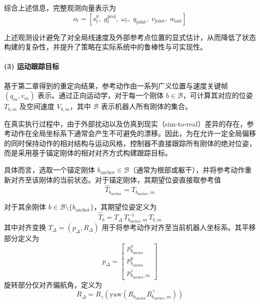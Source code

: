综合上述信息，完整观测向量表示为
\begin{equation}
	o_t = [s_t^g,\; g^{\text{proj}}_t,\; \omega_t,\; q_{\text{joint}},\; v_{\text{joint}},\; a_{\text{last}} ]
\end{equation}

上述观测设计避免了对全局线速度及外部参考点位置的显式估计，从而降低了状态构建的复杂性，并提升了策略在实际系统中的鲁棒性与可实现性。


\paragraph{(3) 运动跟踪目标}

基于第二章得到的重定向结果，参考动作由一系列广义位置与速度关键帧 $(q_m, v_m)$ 表示。通过正向运动学，对于每一个刚体 $b \in \mathcal{B}$，可计算其对应的位姿 $T_{b,m}$ 及空间速度 $V_{b,m}$，其中 $\mathcal{B}$ 表示机器人所有刚体的集合。

在真实执行过程中，由于外部扰动以及仿真到现实（sim-to-real）差异的存在，参考动作在全局坐标系下通常会产生不可避免的漂移。因此，为在允许一定全局偏移的同时保持动作的相对结构与运动风格，控制器不直接跟踪所有刚体的绝对位姿，而是采用基于锚定刚体的相对对齐方式构建跟踪目标。

具体而言，选取一个锚定刚体 $b_{\text{anchor}} \in \mathcal{B}$（通常为根部或躯干），并将参考动作重新对齐至该刚体的当前状态。对于锚定刚体，其期望位姿直接取参考值
\begin{equation}
	\hat{T}_{b_{\text{anchor}}} = T_{b_{\text{anchor}},m}
\end{equation}

对于其余刚体 $b \in \mathcal{B} \setminus \{b_{\text{anchor}}\}$，其期望位姿定义为
\begin{equation}
	\hat{T}_b = T_\Delta \, T^{-1}_{b_{\text{anchor}},m} \, T_{b,m}
\end{equation}
其中对齐变换 $T_\Delta = (p_\Delta, R_\Delta)$ 用于将参考动作对齐至当前机器人坐标系。其平移部分定义为
\begin{equation}
	p_\Delta = 
	\begin{bmatrix}
		p_{b_{\text{anchor}}}^{x} \\
		p_{b_{\text{anchor}}}^{y} \\
		p_{b_{\text{anchor}},m}^{z}
	\end{bmatrix}
\end{equation}
旋转部分仅对齐偏航角，定义为
\begin{equation}
	R_\Delta = R_z\!\left(\mathrm{yaw}\!\left(R_{b_{\text{anchor}}} R^{\top}_{b_{\text{anchor}},m}\right)\right)
\end{equation}

